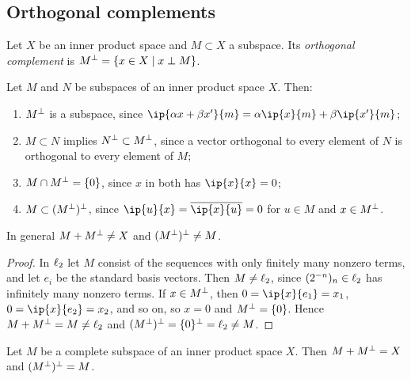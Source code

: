 \subsection{Orthogonal complements}

\begin{definition}\label{def:orth-complement}
Let $X$ be an inner product space and $M \subset X$ a subspace. Its
\emph{orthogonal complement} is
$M^{\perp} = \{x \in X \mid x \perp M\}$.
\end{definition}

\begin{proposition}\label{prop:orth-properties}
Let $M$ and $N$ be subspaces of an inner product space $X$. Then:
\begin{enumerate}
  \item $M^{\perp}$ is a subspace, since
    $\ip{\alpha x + \beta x'}{m} = \alpha\ip{x}{m} + \beta\ip{x'}{m}$;
  \item $M \subset N$ implies $N^{\perp} \subset M^{\perp}$, since a vector
    orthogonal to every element of $N$ is orthogonal to every element of
    $M$;
  \item $M \cap M^{\perp} = \{0\}$, since $x$ in both has
    $\ip{x}{x} = 0$;
  \item $M \subset (M^{\perp})^{\perp}$, since $\ip{u}{x} =
    \overline{\ip{x}{u}} = 0$ for $u \in M$ and $x \in M^{\perp}$.
\end{enumerate}
\end{proposition}

\begin{counterexample}\label{cex:orth}
In general $M + M^{\perp} \ne X$ and $(M^{\perp})^{\perp} \ne M$.
\end{counterexample}

\begin{proof}
In $\ell_{2}$ let $M$ consist of the sequences with only finitely many nonzero
terms, and let $e_i$ be the standard basis vectors. Then $M \ne \ell_{2}$,
since $(2^{-n})_n \in \ell_{2}$ has infinitely many nonzero terms. If
$x \in M^{\perp}$, then $0 = \ip{x}{e_1} = x_1$, $0 = \ip{x}{e_2} = x_2$, and
so on, so $x = 0$ and $M^{\perp} = \{0\}$. Hence
$M + M^{\perp} = M \ne \ell_{2}$ and
$(M^{\perp})^{\perp} = \{0\}^{\perp} = \ell_{2} \ne M$.
\end{proof}

\begin{proposition}\label{prop:orth-complete}
Let $M$ be a complete subspace of an inner product space $X$. Then
$M + M^{\perp} = X$ and $(M^{\perp})^{\perp} = M$.
\end{proposition}


